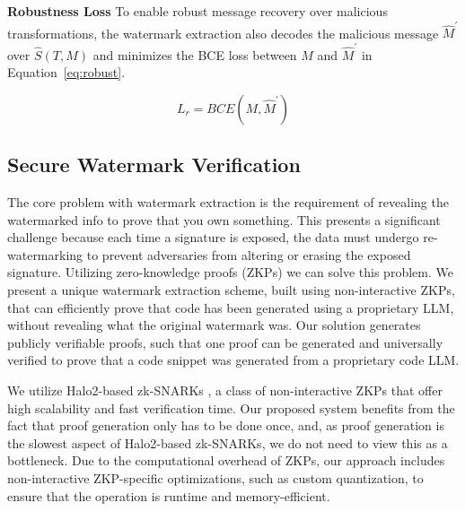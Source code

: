 \textbf{Robustness Loss} To enable robust message recovery over malicious transformations, the watermark extraction also decodes the malicious message $\hat{M}^\prime$ over $\hat{S}(T, M)$ and minimizes the BCE loss between $M$ and $\hat{M}^\prime$ in Equation~\ref{eq:robust}.

\begin{equation}
\label{eq:robust}
L_r = BCE(M, \hat{M}^\prime)
\end{equation}





\subsection{Secure Watermark Verification}


The core problem with watermark extraction is the requirement of revealing the watermarked info to prove that you own something. This presents a significant challenge because each time a signature is exposed, the data must undergo re-watermarking to prevent adversaries from altering or erasing the exposed signature. Utilizing zero-knowledge proofs (ZKPs) we can solve this problem. We present a unique watermark extraction scheme, built using non-interactive ZKPs, that can efficiently prove that code has been generated using a proprietary LLM, without revealing what the original watermark was. Our solution generates publicly verifiable proofs, such that one proof can be generated and universally verified to prove that a code snippet was generated from a proprietary code LLM. 

We utilize Halo2-based zk-SNARKs \cite{halo2_repo}, a class of non-interactive ZKPs that offer high scalability and fast verification time. Our proposed system benefits from the fact that proof generation only has to be done once, and, as proof generation is the slowest aspect of Halo2-based zk-SNARKs, we do not need to view this as a bottleneck. Due to the computational overhead of ZKPs, our approach includes non-interactive ZKP-specific optimizations, such as custom quantization, to ensure that the operation is runtime and memory-efficient. 

